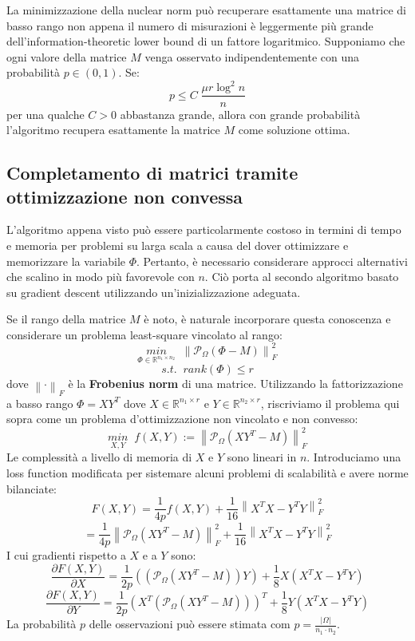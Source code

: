 \documentclass[12pt,a4paper]{report}
\newcommand{\frobnorm}[1]{\left\lVert#1\right\rVert _F}
\begin{document}
La minimizzazione della nuclear norm può recuperare esattamente
una matrice di basso rango non appena il numero di misurazioni è leggermente più grande
dell'information-theoretic lower bound di un fattore logaritmico.
Supponiamo che ogni valore della matrice $M$ venga osservato indipendentemente
con una probabilità $p \in (0,1)$. Se:
$$ p \leq C \; \frac{\mu r \log^2 n}{n} $$
per una qualche $C>0$ abbastanza grande, allora con grande probabilità
l'algoritmo recupera esattamente 
la matrice $M$ come soluzione ottima.

\subsection{Completamento di matrici tramite ottimizzazione non convessa}

L'algoritmo appena visto può essere particolarmente costoso in termini di tempo e memoria
per problemi su larga scala a causa del dover ottimizzare e memorizzare la variabile $\Phi$.
Pertanto, è necessario considerare approcci alternativi che scalino in modo più favorevole con $n$.
Ciò porta al secondo algoritmo basato su gradient descent utilizzando un'inizializzazione adeguata.

Se il rango della matrice $M$ è noto, è naturale incorporare questa conoscenza 
e considerare un problema least-square vincolato al rango:
$$ \underset{\Phi \in \mathbb{R}^{n_1 \times n_2}}{min}\;\; \frobnorm{\mathcal{P}_{\Omega}(\Phi - M)}^2 $$
$$ s.t. \;\;  rank(\Phi) \leq r $$ 
dove $\frobnorm{\cdot}$ è la \textbf{Frobenius norm} di una matrice.
Utilizzando la fattorizzazione a basso rango $\Phi = XY^T$ dove $X \in \mathbb{R}^{n_1 \times r}$
e $Y \in \mathbb{R}^{n_2 \times r}$, riscriviamo il problema qui sopra come 
un problema d'ottimizzazione non vincolato e non convesso:
$$ \underset{X,Y}{min}\;\; \mathit{f}(X,Y) := \frobnorm{\mathcal{P}_{\Omega}(XY^T - M)}^2 $$
Le complessità a livello di memoria di $X$ e $Y$ sono lineari in $n$.
Introduciamo una loss function modificata per sistemare alcuni
problemi di scalabilità e avere norme bilanciate:
$$ F(X,Y) = \frac{1}{4p}\mathit{f}(X,Y) + \frac{1}{16}\frobnorm{X^TX - Y^TY}^2  $$
$$ = \frac{1}{4p}\frobnorm{\mathcal{P}_{\Omega}(XY^T - M)}^2 + \frac{1}{16}\frobnorm{X^TX - Y^TY}^2 $$
I cui gradienti rispetto a $X$ e a $Y$ sono:
$$ \frac{\partial F(X,Y)}{\partial X} = \frac{1}{2p} ((\mathcal{P}_{\Omega}(XY^T - M))Y) + \frac{1}{8} X (X^TX-Y^TY)$$
$$ \frac{\partial F(X,Y)}{\partial Y} = \frac{1}{2p} (X^T(\mathcal{P}_{\Omega}(XY^T - M)))^T + \frac{1}{8} Y (X^TX-Y^TY)$$
\newpage
La probabilità $p$ delle osservazioni può essere stimata com $p = \frac{|\Omega|}{n_1\cdot n_2}$.
\end{document}
